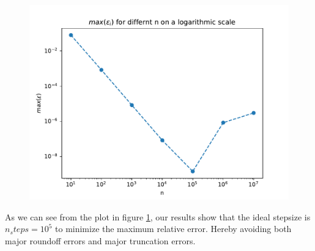 \documentclass[english,notitlepage]{revtex4-1}  %
\begin{document}
\begin{enumerate}[label= \alph*)]

  \begin{figure}[H]
    \centering
    \includegraphics[width=\textwidth]{../figures/max_rel_error.pdf}
    \caption{}
    \label{fig:max_rel_error}
  \end{figure}
As we can see from the plot in figure \ref{fig:max_rel_error}, our results show that the ideal stepsize is $n_steps = 10^5$ to minimize the maximum relative error. Hereby avoiding both major roundoff errors and major truncation errors.
\end{enumerate}
\end{document}
